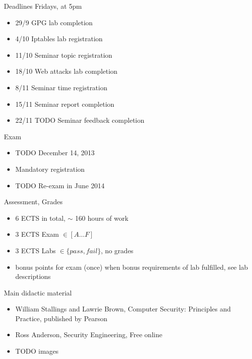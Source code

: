 \documentclass{beamer}
\newcommand{\todo}[1]{\alert{TODO #1}}
\begin{document}
\begin{frame}{Deadlines}
  Fridays, at 5pm
  \begin{itemize}
  \item 29/9 GPG lab completion 
  \item 4/10 Iptables lab registration 
  \item 11/10 Seminar topic registration 
  \item 18/10 Web attacks lab completion 
  \item 8/11 Seminar time registration 
  \item 15/11 Seminar report completion 
  \item 22/11 \todo{Seminar feedback completion}
  \end{itemize}
\end{frame}

\begin{frame}{Exam}
  \begin{itemize}
  \item \todo{December 14, 2013}
  \item \alert{Mandatory} registration 
  \item \todo{Re-exam in June 2014}
  \end{itemize}
\end{frame}

\begin{frame}{Assessment, Grades}
  \begin{itemize}
  \item 6 ECTS in total, $\sim$ 160 hours of work 
  \item 3 ECTS Exam $\in [A \dots F]$
  \item 3 ECTS Labs $\in \{pass,fail\}$, no grades
  \item bonus points for exam (once) when bonus 
    requirements of lab fulfilled, see lab descriptions
  \end{itemize}
\end{frame}

\begin{frame}{Main didactic material}
  \begin{itemize}
  \item William Stallings and Lawrie Brown, Computer Security:
    Principles and Practice, published by Pearson 
  \item Ross Anderson, Security Engineering, Free online
  \item \todo{images}
  \end{itemize}
\end{frame}
\end{document}
